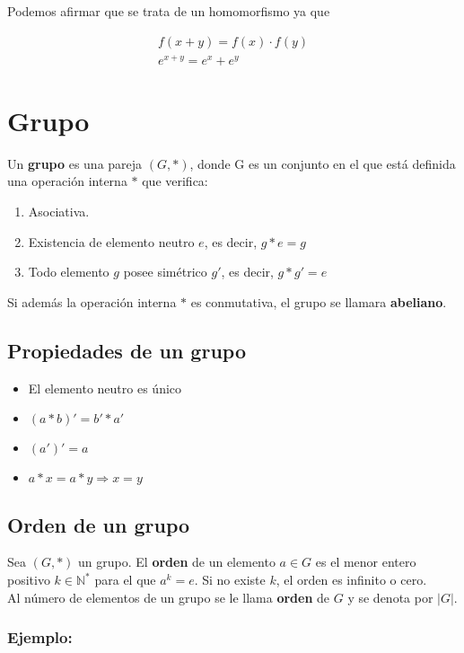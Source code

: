 \documentclass[0_algebra.tex]{subfiles}
\begin{document}
Podemos afirmar que se trata de un homomorfismo ya que

$$
\begin{matrix}
f(x+y)=f(x)\cdot f(y)\\
e^{x+y}=e^x+e^y
\end{matrix}
$$
\section{Grupo}
Un \textbf{grupo} es una pareja $(G,*)$, donde G es un conjunto en el que está definida una operación interna $*$ que verifica:
\begin{enumerate}
\item Asociativa.
\item Existencia de elemento neutro $e$, es decir, $g*e=g$
\item Todo elemento $g$ posee simétrico $g'$, es decir, $g*g'=e$
\end{enumerate}
Si además la operación interna $*$ es conmutativa, el grupo se llamara \textbf{abeliano}.\\

\subsection*{Propiedades de un grupo}
\begin{itemize}
\item El elemento neutro es único
\item $(a*b)'=b'*a'$
\item $(a')'=a$
\item $a*x=a*y \Rightarrow x=y$
\end{itemize}

\subsection*{Orden de un grupo}
Sea $(G,*)$ un grupo. El \textbf{orden} de un elemento $a \in G$ es el menor entero positivo $k\in \mathbb{N}^*$ para el que $a^k=e$. Si no existe $k$, el orden es infinito o cero.\\

Al número de elementos de un grupo se le llama \textbf{orden} de $G$ y se denota por $|G|$.\\



\subsubsection*{Ejemplo:}
\end{document}
